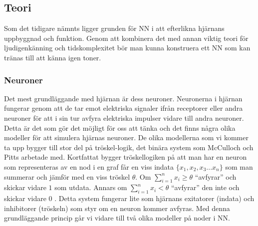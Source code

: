 \documentclass[a4paper,10pt]{article}
\begin{document}
\subsection{Teori}

Som det tidigare nämnts ligger grunden för NN i att efterlikna hjärnans uppbyggnad och funktion. Genom att kombinera det med annan viktig teori för ljudigenkänning och tidskomplexitet bör man kunna konstruera ett NN som kan tränas till att känna igen toner.

\subsubsection{Neuroner}
Det mest grundläggande med hjärnan är dess neuroner. Neuronerna i hjärnan fungerar genom att de tar emot elektriska signaler ifrån receptorer eller andra neuroner för att i sin tur avfyra elektriska impulser vidare till andra neuroner. Detta är det som gör det möjligt för oss att tänka och det finns några olika modeller för att simulera hjärnas neuroner. De olika modellerna som vi kommer ta upp bygger till stor del på tröskel-logik, det binära system som McCulloch och Pitts arbetade med. Kortfattat bygger tröskellogiken på att man har en neuron som representeras av en nod i en graf får en viss indata $ \{ x_1,x_2,x_3...x_n \} $ som man summerar och jämför med en viss tröskel 
$\theta$. Om $ \sum_{i=1}^{n} x_i \geq \theta$ ``avfyrar'' och skickar vidare $1$ som utdata. Annars om $ \sum_{i=1}^{n} x_i < \theta$ ``avfyrar'' den inte och skickar vidare 
$0$ \autocite{Threshold}. Detta system fungerar lite som hjärnans exitatorer (indata) och inhibitorer (tröskeln) som styr om en neuron kommer avfyras. Med denna grundläggande princip går vi vidare till två olika modeller på noder i NN.
\end{document}
